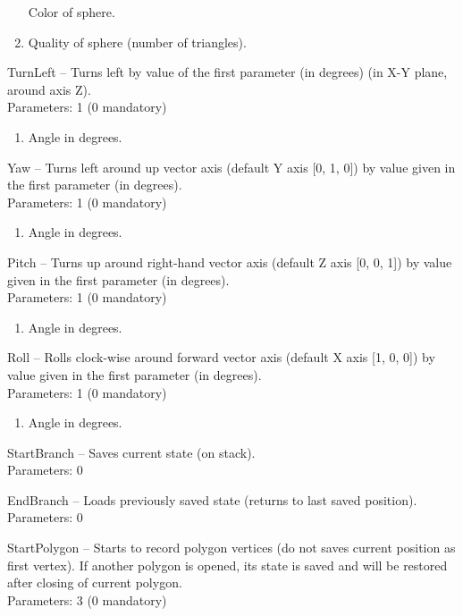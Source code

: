 \begin{description*}
\begin{enumerate}
            Color of sphere.				\item
            Quality of sphere (number of triangles).			\end{enumerate}
		\item[TurnLeft]
			-- Turns left by value of the first parameter (in degrees) (in X-Y plane, around axis Z).
		\\ Parameters: 1  (0 mandatory) 
			\begin{enumerate}
				\item
Angle in degrees.			\end{enumerate}
		\item[Yaw]
			-- Turns left around up vector axis (default Y axis [0, 1, 0]) by value given in the first parameter (in degrees).
		\\ Parameters: 1  (0 mandatory) 
			\begin{enumerate}
				\item
Angle in degrees.			\end{enumerate}
		\item[Pitch]
			-- Turns up around right-hand vector axis (default Z axis [0, 0, 1]) by value given in the first parameter (in degrees).
		\\ Parameters: 1  (0 mandatory) 
			\begin{enumerate}
				\item
Angle in degrees.			\end{enumerate}
		\item[Roll]
			-- Rolls clock-wise around forward vector axis (default X axis [1, 0, 0]) by value given in the first parameter (in degrees).
		\\ Parameters: 1  (0 mandatory) 
			\begin{enumerate}
				\item
Angle in degrees.			\end{enumerate}
		\item[StartBranch]
			-- Saves current state (on stack).
		\\ Parameters: 0 
		\item[EndBranch]
			-- Loads previously saved state (returns to last saved position).
		\\ Parameters: 0 
		\item[StartPolygon]
			-- Starts to record polygon vertices (do not saves current position as first vertex).
            If another polygon is opened, its state is saved and will be restored after closing of current polygon.
		\\ Parameters: 3  (0 mandatory) 

\end{description*}
